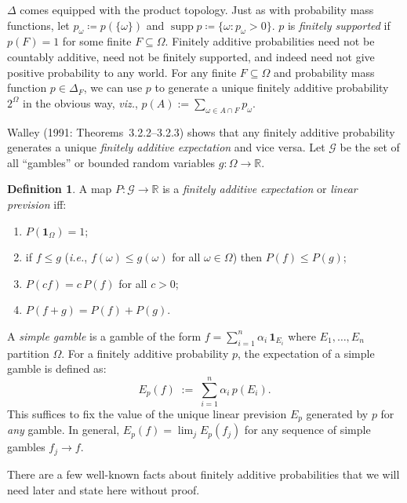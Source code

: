 \documentclass[11pt]{article}
\theoremstyle{definition}
\newtheorem{definition}[theorem]{Definition}
\theoremstyle{remark}
\newcommand{\G}{\mathcal G}
\newcommand{\supp}{\operatorname{supp}}
\begin{document}
$\Delta$ comes equipped with the product topology. Just as with probability mass functions, let $p_\omega\coloneqq p(\{\omega\})$ and $\supp p\coloneqq\{\omega:p_\omega>0\}$.  $p$ is \emph{finitely supported} if $p(F)=1$ for some finite $F\subseteq\Omega$. Finitely additive probabilities need not be countably additive, need not be finitely supported, and indeed need not give positive probability to any world. For any finite $F\subseteq\Omega$ and probability mass function $p\in\Delta_F$, we can use $p$ to generate a unique finitely additive probability $2^\Omega$ in the obvious way, \textit{viz.}, $p(A):=\sum_{\omega\in A\cap F}p_\omega$.


Walley (1991: Theorems~3.2.2--3.2.3) shows that any finitely additive probability generates a unique \textit{finitely additive expectation} and vice versa. Let $\G$ be the set of all ``gambles'' or bounded random variables $g:\Omega\to\mathbb R$.


\begin{definition}\label{def:finitely-additive-expectation}
A map $P\colon\G\to\mathbb R$ is a \textit{finitely additive expectation} or \textit{linear prevision} iff:
\begin{enumerate}[label=\textup{(LNP\arabic*)}]
  \item $P(\mathbf{1}_\Omega)=1$;
  \item if $f\leq g$ (\textit{i.e.}, $f(\omega)\leq g(\omega)$ for all $\omega\in\Omega$) then $P(f)\leq P(g)$;
  \item $P(cf)=c\,P(f)$ for all $c>0$;
  \item $P(f+g)=P(f)+P(g)$.
\end{enumerate}
\end{definition}

A \emph{simple gamble} is a gamble of the form $f=\sum_{i=1}^{n}\alpha_i\,\mathbf{1}_{E_i}$ where $E_1,\ldots,E_n$ partition $\Omega$. For a finitely additive probability $p$, the expectation of a simple gamble is defined as:
\[
  E_p(f) \;:=\; \sum_{i=1}^{n}\alpha_i\,p(E_i).
\]
This suffices to fix the value of the unique linear prevision $E_p$ generated by $p$ for \textit{any} gamble. In general, $E_p(f)=\lim_jE_p(f_j)$ for any sequence of simple gambles $f_j\to f$.


There are a few well-known facts about finitely additive probabilities that we will need later and state here without proof.
\end{document}
